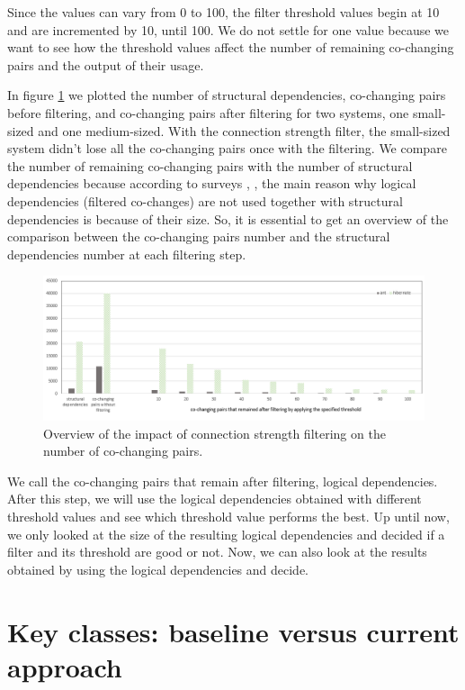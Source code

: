 \documentclass[runningheads]{comsis2}
\begin{document}
Since the values can vary from 0 to 100, the filter threshold values begin at 10 and are incremented by 10, until 100. We do not settle for one value because we want to see how the threshold values affect the number of remaining co-changing pairs and the output of their usage.

In figure \ref{fig:strength_overview} we plotted the number of structural dependencies, co-changing pairs before filtering, and co-changing pairs after filtering for two systems, one small-sized and one medium-sized. With the connection strength filter, the small-sized system didn't lose all the co-changing pairs once with the filtering.
We compare the number of remaining co-changing pairs with the number of structural dependencies because according to surveys \cite{Shtern:2012:CMS:2332427.2332428}, \cite{sar}, the main reason why logical dependencies (filtered co-changes) are not used together with structural dependencies is because of their size. So, it is essential to get an overview of the comparison between the co-changing pairs number and the structural dependencies number at each filtering step.

\begin{figure}
\centering
\includegraphics[width=\textwidth]{strength_overview.PNG}
\caption{Overview of the impact of connection strength filtering on the number of co-changing pairs. }
\label{fig:strength_overview}
\centering
\end{figure}

We call the co-changing pairs that remain after filtering, logical dependencies. 
After this step, we will use the logical dependencies obtained with different threshold values and see which threshold value performs the best. Up until now, we only looked at the size of the resulting logical dependencies and decided if a filter and its threshold are good or not. Now, we can also look at the results obtained by using the logical dependencies and decide.

\section{Key classes: baseline versus current approach}
\label{sec:baseline_approach}
\end{document}
